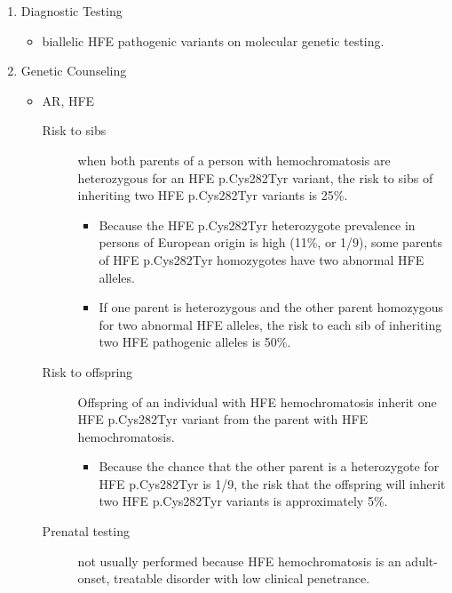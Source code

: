 \documentclass[12pt]{scrartcl}
\begin{document}
\begin{enumerate}
\item Diagnostic Testing
\label{sec:org9fdd7fe}
\begin{itemize}
\item biallelic HFE pathogenic variants on molecular genetic testing.
\end{itemize}
\item Genetic Counseling
\label{sec:orgae95b71}
\begin{itemize}
\item AR, HFE
\begin{description}
\item[{Risk to sibs}] when both parents of a person with hemochromatosis
are heterozygous for an HFE p.Cys282Tyr variant,
the risk to sibs of inheriting two HFE p.Cys282Tyr
variants is 25\%.
\begin{itemize}
\item Because the HFE p.Cys282Tyr heterozygote prevalence in persons
of European origin is high (11\%, or 1/9), some parents of HFE
p.Cys282Tyr homozygotes have two abnormal HFE alleles.
\item If one parent is heterozygous and the other parent homozygous
for two abnormal HFE alleles, the risk to each sib of inheriting
two HFE pathogenic alleles is 50\%.
\end{itemize}
\item[{Risk to offspring}] Offspring of an individual with HFE
hemochromatosis inherit one HFE p.Cys282Tyr variant from the
parent with HFE hemochromatosis.
\begin{itemize}
\item Because the chance that the other parent is a heterozygote for
HFE p.Cys282Tyr is 1/9, the risk that the offspring will inherit
two HFE p.Cys282Tyr variants is approximately 5\%.
\end{itemize}
\item[{Prenatal testing}] not usually performed because HFE
hemochromatosis is an adult-onset, treatable disorder with low
clinical penetrance.
\end{description}
\end{itemize}
\end{enumerate}
\end{document}
